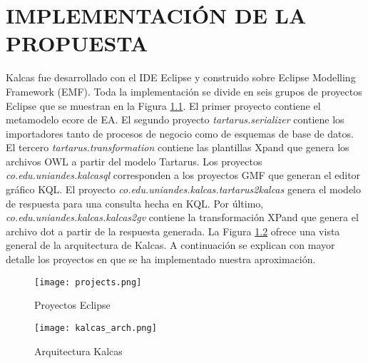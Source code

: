 \chapter{IMPLEMENTACI\'ON DE LA PROPUESTA} \label{cha:implementacion}

Kalcas fue desarrollado con el IDE Eclipse y construido sobre Eclipse Modelling Framework (EMF). Toda la implementaci\'on se divide en seis grupos de proyectos Eclipse que se muestran en la Figura \ref{fig:projects}. El primer proyecto contiene el metamodelo ecore de EA. El segundo proyecto \textit{tartarus.serializer} contiene los importadores tanto de procesos de negocio como de esquemas de base de datos. El tercero \textit{tartarus.transformation} contiene las plantillas Xpand que genera los archivos OWL a partir del modelo Tartarus. Los proyectos \textit{co.edu.uniandes.kalcasql} corresponden a los proyectos GMF que generan el editor gr\'afico KQL. El proyecto \textit{co.edu.uniandes.kalcas.tartarus2kalcas} genera el modelo de respuesta para una consulta hecha en KQL. Por \'ultimo, \textit{co.edu.uniandes.kalcas.kalcas2gv} contiene la transformaci\'on XPand que genera el archivo dot a partir de la respuesta generada. La Figura \ref{fig:arch} ofrece una vista general de la arquitectura de Kalcas. A continuaci\'on se explican con mayor detalle los proyectos en que se ha implementado nuestra aproximaci\'on.

\begin{figure}[!t]
\begin{center}
	\texttt{[image: projects.png]}
	\caption{Proyectos Eclipse}
	\label{fig:projects}
\end{center}
\end{figure} 

\begin{figure}[!t]
\begin{center}
	\texttt{[image: kalcas\_arch.png]}
	\caption{Arquitectura Kalcas}
	\label{fig:arch}
\end{center}
\end{figure} 


